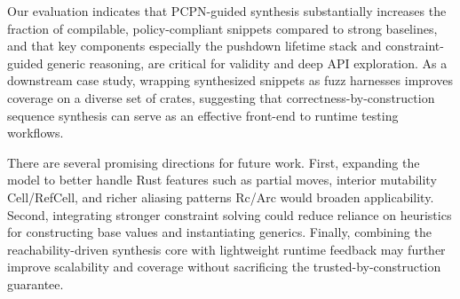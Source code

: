 \documentclass[sigconf]{acmart}
\begin{document}
Our evaluation indicates that PCPN-guided synthesis substantially increases the fraction of compilable, policy-compliant snippets compared to strong baselines, and that key components especially the pushdown lifetime stack and constraint-guided generic reasoning, are critical for validity and deep API exploration.
As a downstream case study, wrapping synthesized snippets as fuzz harnesses improves coverage on a diverse set of crates, suggesting that correctness-by-construction sequence synthesis can serve as an effective front-end to runtime testing workflows.

There are several promising directions for future work. First, expanding the model to better handle Rust features such as partial moves, interior mutability Cell/RefCell, and richer aliasing patterns Rc/Arc would broaden applicability. Second, integrating stronger constraint solving  could reduce reliance on heuristics for constructing base values and instantiating generics. Finally, combining the reachability-driven synthesis core with lightweight runtime feedback may further improve scalability and coverage without sacrificing the trusted-by-construction guarantee.




\end{document}
